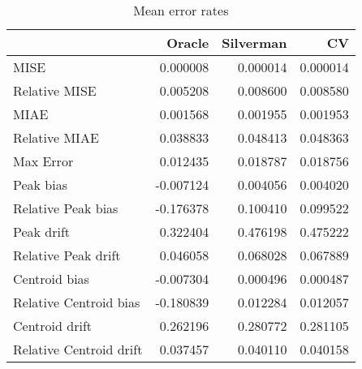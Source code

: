 \begin{table}[ht]
\centering
\begin{tabular}{lrrr}
  \hline
 & Oracle & Silverman & CV \\ 
  \hline
MISE & 0.000008 & 0.000014 & 0.000014 \\ 
  Relative MISE & 0.005208 & 0.008600 & 0.008580 \\ 
  MIAE & 0.001568 & 0.001955 & 0.001953 \\ 
  Relative MIAE & 0.038833 & 0.048413 & 0.048363 \\ 
  Max Error & 0.012435 & 0.018787 & 0.018756 \\ 
  Peak bias & -0.007124 & 0.004056 & 0.004020 \\ 
  Relative Peak bias & -0.176378 & 0.100410 & 0.099522 \\ 
  Peak drift & 0.322404 & 0.476198 & 0.475222 \\ 
  Relative Peak drift & 0.046058 & 0.068028 & 0.067889 \\ 
  Centroid bias & -0.007304 & 0.000496 & 0.000487 \\ 
  Relative Centroid bias & -0.180839 & 0.012284 & 0.012057 \\ 
  Centroid drift & 0.262196 & 0.280772 & 0.281105 \\ 
  Relative Centroid drift & 0.037457 & 0.040110 & 0.040158 \\ 
   \hline
\end{tabular}
\caption{Mean error rates} 
\label{tbl:mean_error_rates}
\end{table}
